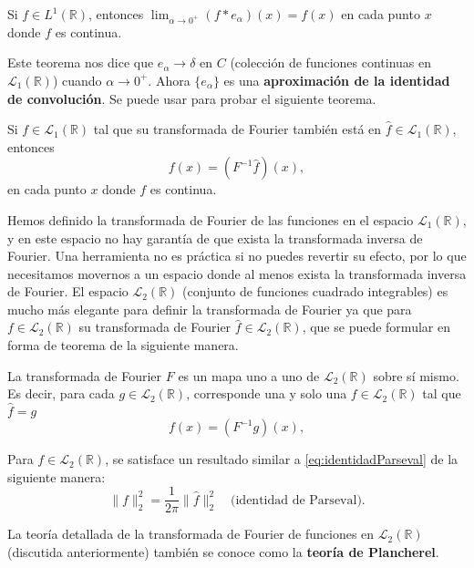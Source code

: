 \begin{multicols}{2}
\begin{teorema}
    Si $f \in L^1(\mathbb{R})$, entonces $\lim_{\alpha \rightarrow 0^+} (f * e_{\alpha})(x) = f(x)$ en cada punto $x$ donde $f$ es continua.
\end{teorema}
Este teorema nos dice que $e_{\alpha} \rightarrow \delta$ en $C$ (colección de funciones continuas en $\mathcal{L}_1(\mathbb{R})$) cuando $\alpha \rightarrow 0^+$. Ahora $\{e_{\alpha}\}$ es una \textbf{aproximación de la identidad de convolución}. Se puede usar para probar el siguiente teorema.

\begin{teorema}
    Si $f \in \mathcal{L}_1(\mathbb{R})$ tal que su transformada de Fourier también está en $\hat{f} \in \mathcal{L}_1(\mathbb{R})$, entonces
    $$f(x) = (F^{-1}\hat{f})(x),$$
    en cada punto $x$ donde $f$ es continua.
\end{teorema}

Hemos definido la transformada de Fourier de las funciones en el espacio $\mathcal{L}_1(\mathbb{R})$, y en este espacio no hay garantía de que exista la transformada inversa de Fourier. Una herramienta no es práctica si no puedes revertir su efecto, por lo que necesitamos movernos a un espacio donde al menos exista la transformada inversa de Fourier. El espacio $\mathcal{L}_2(\mathbb{R})$ (conjunto de funciones cuadrado integrables) es mucho más elegante para definir la transformada de Fourier ya que para $f \in \mathcal{L}_2(\mathbb{R})$ su transformada de Fourier $\hat{f} \in \mathcal{L}_2(\mathbb{R})$, que se puede formular en forma de teorema de la siguiente manera.
\begin{teorema}
    La transformada de Fourier $F$ es un mapa uno a uno de $\mathcal{L}_2(\mathbb{R})$ sobre sí mismo. Es decir, para cada $g \in \mathcal{L}_2(\mathbb{R})$, corresponde una y solo una $f \in \mathcal{L}_2(\mathbb{R})$ tal que $\hat{f} = g$
    $$f(x) = (F^{-1}g)(x),$$
\end{teorema}

Para $f \in \mathcal{L}_2(\mathbb{R})$, se satisface un resultado similar a \ref{eq:identidadParseval} de la siguiente manera:
\begin{equation}
	\|f\|_2^2 = \frac{1}{2\pi} \|\hat{f}\|_2^2 \quad \text{(identidad de Parseval)}.
\label{eq:identidadParseval2}
\end{equation}

La teoría detallada de la transformada de Fourier de funciones en $\mathcal{L}_2(\mathbb{R})$ (discutida anteriormente)  también se conoce como la \textbf{teoría de Plancherel}.




\end{multicols}
